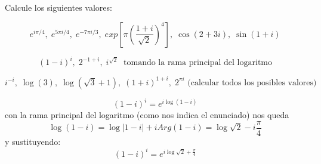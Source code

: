 \begin{problem}[10]
Calcule los siguientes valores:

\ppart
\[e^{iπ/4}, \; e^{5πi/4}, \; e^{-7πi/3}, \; exp\left[π \left(\frac{1+i}{\sqrt{2}} \right)^4 \right], \; \cos(2+3i), \; \sin(1+i)\]

\ppart
\[(1-i)^i, \; 2^{-1+i}, \; i^{\sqrt{2}} \; \text{ tomando la rama principal del logaritmo}\]

\ppart
\[i^{-i}, \; \log(3) , \; \log(\sqrt{3}+1), \; (1+i)^{1+i}, \; 2^{πi} \text{ (calcular todos los posibles valores)}\]

\solution

\spart

\spart
\[(1-i)^i = e^{i\log (1-i)}\]
con la rama principal del logaritmo (como nos indica el enunciado) nos queda
\[\log(1-i) = \log|1-i| + i Arg(1-i) = \log \sqrt{2}-i\frac{π}{4}\]
y sustituyendo:
\[(1-i)^i = e^{i \log \sqrt{2}+\frac{π}{4}}\]


\spart
\end{problem}

